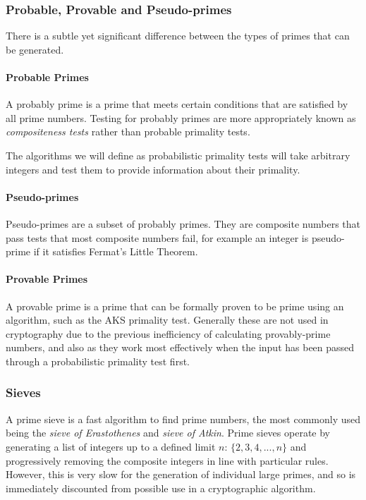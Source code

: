     \subsubsection{Probable, Provable and Pseudo-primes}
    
    There is a subtle yet significant difference between the types of primes that can be generated.
    
      \paragraph{Probable Primes}
      
      A probably prime is a prime that meets certain conditions that are satisfied by all prime numbers. Testing for probably primes are more appropriately known as \emph{compositeness tests} rather than probable primality tests.
      
      The algorithms we will define as probabilistic primality tests will take arbitrary integers and test them to provide information about their primality. 
      
      \paragraph{Pseudo-primes}
      
      Pseudo-primes are a subset of probably primes. They are composite numbers that pass tests that most composite numbers fail, for example an integer is pseudo-prime if it satisfies Fermat's Little Theorem.
      
      \paragraph{Provable Primes}
      
      A provable prime is a prime that can be formally proven to be prime using an algorithm, such as the AKS primality test. Generally these are not used in cryptography due to the previous inefficiency of calculating provably-prime numbers, and also as they work most effectively when the input has been passed through a probabilistic primality test first.
  
    \subsubsection{Sieves}
    
    A prime sieve is a fast algorithm to find prime numbers, the most commonly used being the \emph{sieve of Erastothenes} and \emph{sieve of Atkin}. Prime sieves operate by generating a list of integers up to a defined limit $n$: $\{2,3,4,...,n\}$ and progressively removing the composite integers in line with particular rules. However, this is very slow for the generation of individual large primes, and so is immediately discounted from possible use in a cryptographic algorithm.
    
